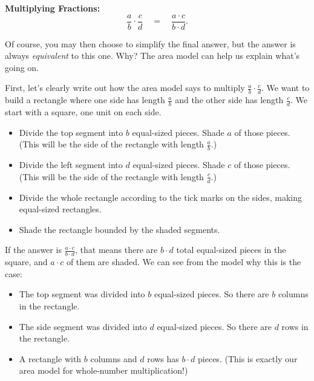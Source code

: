 {\bf Multiplying Fractions:}
\[
\frac a b \cdot \frac cd 
\quad
=
\quad
 \frac{a\cdot c}{b\cdot d}.
\]

Of course, you may then choose to simplify the final answer, but the answer is always \emph{equivalent} to this one.  Why?  The area model can help us explain what's going on.  

First, let's clearly write out how the area model says to multiply $\frac ab \cdot \frac cd$.  We want to build a rectangle where one side has length $\frac a b$ and the other side has length $\frac c d$.  We start with a square, one unit on each side.
\begin{itemize}
\item
Divide the top segment into $b$ equal-sized pieces.  Shade $a$ of those pieces.  (This will be the side of the rectangle with length $\frac a b$.)\\

\item
Divide the left segment into $d$ equal-sized pieces.  Shade $c$ of those pieces.  (This will be the side of the rectangle with length $\frac c d$.)\\

\item
Divide the whole rectangle according to the tick marks on the sides, making equal-sized rectangles.\\

\item
Shade the rectangle bounded by the shaded segments.\\

\end{itemize}



If the answer is $\frac{a\cdot c}{b\cdot d}$, that means there are $b\cdot d$ total equal-sized pieces in the square, and $a\cdot c$ of them are shaded.  We can see from the model why this is the case:

\begin{itemize}
\item
The top segment was divided into $b$ equal-sized pieces.  So there are $b$ columns in the rectangle.\\

\item
The side segment was divided into $d$ equal-sized pieces.  So there are $d$ rows in the rectangle.\\

\item
A rectangle with $b$ columns and $d$ rows has $b\cdot d$ pieces.  (This is exactly our area model for whole-number multiplication!)\\
\end{itemize}


